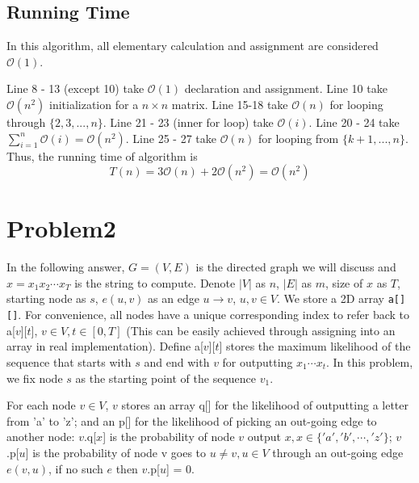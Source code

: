\documentclass[openany]{article}
\begin{document}
\subsection*{Running Time}
In this algorithm, all elementary calculation and assignment are considered $\mathcal{O}(1)$.

Line 8 - 13 (except 10) take $\mathcal{O}(1)$ declaration and assignment. Line 10 take $\mathcal{O}(n^2)$ initialization for a $n\times n$ matrix. Line 15-18 take $\mathcal{O}(n)$ for looping through $\{2,3,...,n\}$. Line 21 - 23 (inner for loop) take $\mathcal{O}(i)$. Line 20 - 24 take $\sum_{i=1}^{n}\mathcal{O}(i) = \mathcal{O}(n^2)$. Line 25 - 27 take $\mathcal{O}(n)$ for looping from $\{k+1,...,n\}$. Thus, the running time of algorithm is
\[T(n) = 3\mathcal{O}(n) + 2\mathcal{O}(n^2) = \mathcal{O}(n^2)\]


\section*{Problem2}

In the following answer, $G = (V,E)$ is the directed graph we will discuss and $x=x_1x_2\cdots x_T$ is the string to compute. Denote $|V|$ as $n$, $|E|$ as $m$, size of $x$ as $T$, starting node as $s$, $e(u,v)$ as an edge $u \rightarrow v$, $u,v\in V$. We store a 2D array \texttt{a[][]}. For convenience, all nodes have a unique corresponding index to refer back to a[$v$][$t$], $v\in V, t\in [0, T]$ (This can be easily achieved through assigning into an array in real implementation). Define a[$v$][$t$] stores the maximum likelihood of the sequence that starts with $s$ and end with $v$ for outputting $x_1\cdots x_t$. In this problem, we fix node $s$ as the starting point of the sequence $v_1$.

For each node $v\in V$, $v$ stores an array q[] for the likelihood of outputting a letter from 'a' to 'z'; and an p[] for the likelihood of picking an out-going edge to another node: $v$.q[$x$] is the probability of node $v$ output $x, x \in \{'a','b', \cdots, 'z'\}$; $v$.p[$u$] is the probability of node v goes to $u \neq v, u \in V$ through an out-going edge $e(v,u)$, if no such $e$ then $v$.p[$u$] = 0. 
\end{document}
